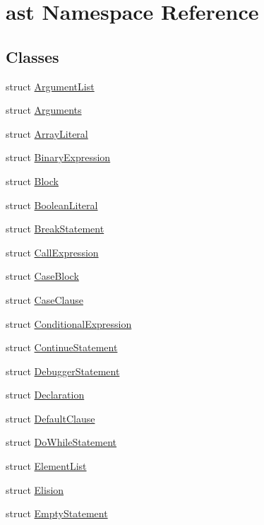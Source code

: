 \hypertarget{namespaceast}{}\section{ast Namespace Reference}
\label{namespaceast}
\subsection*{Classes}
\begin{DoxyCompactItemize}
\item 
struct \hyperlink{structast_1_1_argument_list}{Argument\+List}
\item 
struct \hyperlink{structast_1_1_arguments}{Arguments}
\item 
struct \hyperlink{structast_1_1_array_literal}{Array\+Literal}
\item 
struct \hyperlink{structast_1_1_binary_expression}{Binary\+Expression}
\item 
struct \hyperlink{structast_1_1_block}{Block}
\item 
struct \hyperlink{structast_1_1_boolean_literal}{Boolean\+Literal}
\item 
struct \hyperlink{structast_1_1_break_statement}{Break\+Statement}
\item 
struct \hyperlink{structast_1_1_call_expression}{Call\+Expression}
\item 
struct \hyperlink{structast_1_1_case_block}{Case\+Block}
\item 
struct \hyperlink{structast_1_1_case_clause}{Case\+Clause}
\item 
struct \hyperlink{structast_1_1_conditional_expression}{Conditional\+Expression}
\item 
struct \hyperlink{structast_1_1_continue_statement}{Continue\+Statement}
\item 
struct \hyperlink{structast_1_1_debugger_statement}{Debugger\+Statement}
\item 
struct \hyperlink{structast_1_1_declaration}{Declaration}
\item 
struct \hyperlink{structast_1_1_default_clause}{Default\+Clause}
\item 
struct \hyperlink{structast_1_1_do_while_statement}{Do\+While\+Statement}
\item 
struct \hyperlink{structast_1_1_element_list}{Element\+List}
\item 
struct \hyperlink{structast_1_1_elision}{Elision}
\item 
struct \hyperlink{structast_1_1_empty_statement}{Empty\+Statement}

\end{DoxyCompactItemize}
